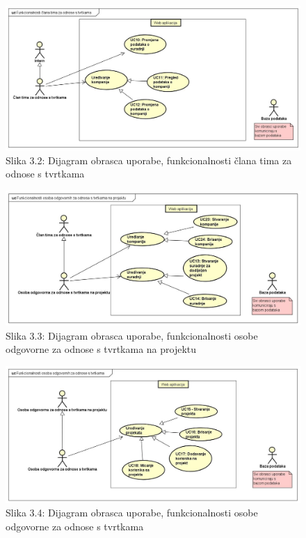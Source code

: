					\begin{figure}[H]
						\includegraphics[scale=0.4]{slike/UC dijagrami/UseCase FR team member}
						\centering
						\caption{Slika 3.2: Dijagram obrasca uporabe, funkcionalnosti člana tima za odnose s tvrtkama}
						\label{fig:frTeamMember}
					\end{figure}

					\begin{figure}[H]
						\includegraphics[scale=0.4]{slike/UC dijagrami/UseCase FR responsible}
						\centering
						\caption{Slika 3.3: Dijagram obrasca uporabe, funkcionalnosti osobe odgovorne za odnose s tvrtkama na projektu}
						\label{fig:frResponsible}
					\end{figure}

					\begin{figure}[H]
						\includegraphics[scale=0.4]{slike/UC dijagrami/UseCase moderator}
						\centering
						\caption{Slika 3.4: Dijagram obrasca uporabe, funkcionalnosti osobe odgovorne za odnose s tvrtkama}
						\label{fig:frModerator}
					\end{figure}

